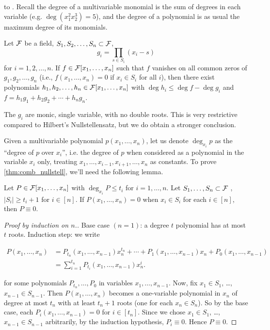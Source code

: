  to .
Recall the degree of a multivariable monomial is the sum of degrees in each variable (e.g. $\deg (x_1^2 x_2^3) = 5$), and the degree of a polynomial is as usual the maximum degree of its monomials.
\begin{theorem} \label{thm:comb_nullstell}
Let $\mathcal{F}$ be a field, $S_1,S_2,\dotsc,S_n\subset \mathcal{F}$, 
\[
g_i = \prod_{s\in S_i}(x_i - s)
\]
for $i=1,2,\dotsc, n$.
If $f\in \mathcal{F}[x_1,\dotsc,x_n]$ such that $f$ vanishes on all common zeros of $g_1,g_2,\dotsc,g_n$ (i.e., $f(x_1,\dotsc,x_n) = 0$ if $x_i\in S_i$ for all $i$), then there exist polynomials $h_1,h_2,\dotsc,h_n\in \mathcal{F}[x_1,\dotsc,x_n]$ with $\deg h_i \leq \deg f - \deg g_i$ and $f = h_1g_1 + h_2g_2 + \dotsm + h_n g_n$.
\end{theorem}
\begin{remark}
The $g_i$ are monic, single variable, with no double roots. This is very restrictive compared to Hilbert's Nullstellensatz, but we do obtain a stronger conclusion.
\end{remark}
Given a multivariable polynomial $p(x_1,\dotsc,x_n)$, let us denote $\deg_{x_i} p$ as the ``degree of $p$ over $x_i$'', i.e. the degree of $p$ when considered as a polynomial in the variable $x_i$ only, treating $x_1,\dotsc,x_{i-1},x_{i+1},\dotsc,x_n$ as constants. To prove \cref{thm:comb_nullstell}, we'll need the following lemma.
\begin{lemma} \label{lem:comb_null_p_vanish}
Let $P\in \mathcal{F}[x_1,\dotsc,x_n]$ with $\deg_{x_i} P \leq t_i$ for $i=1,\dotsc,n$. Let $S_1,\dotsc, S_n \subset \mathcal{F}$ , $|S_i|\geq t_i+1$ for $i\in[n]$. If $P (x_1,\dotsc,x_n) = 0$ when  $x_i\in S_i$ for each $i\in [n]$, then $P \equiv 0$.
\end{lemma}
\begin{proof}[Proof by induction on $n$.]
Base case $(n=1)$: a degree $t$ polynomial has at most $t$ roots.
Induction step: we write
\begin{fullwidth}
\begin{align*}	
P(x_1,\dotsc,x_n) &= P_{t_n}(x_1,\dotsc,x_{n-1}) x_n^{t_n} + \dotsm + P_1 (x_1,\dotsc,x_{n-1}) x_n + P_0 (x_1,\dotsc,x_{n-1}) \\
&= \sum_{i=1}^{t_n} P_{t_i}(x_1,\dotsc,x_{n-1}) x_n^i.
\end{align*}
\end{fullwidth}
for some polynomials $P_{t_n},\dotsc,P_0$ in variables $x_1,\dotsc,x_{n-1}$. 
Now, fix $x_1\in S_1$, \ldots, $x_{n-1} \in S_{n-1}$. Then $P(x_1,\dotsc,x_n)$ becomes a one-variable polynomial in $x_n$ of degree at most $t_n$ with at least $t_n+1$ roots (one for each $x_n \in S_n$). So by the base case, each $P_i(x_1,\dotsc,x_{n-1}) = 0$ for $i\in[t_n]$. Since we chose $x_1\in S_1$, \ldots, $x_{n-1}\in S_{n-1}$ arbitrarily, by the induction hypothesis, $P_i \equiv 0$. Hence $P\equiv 0$.
\end{proof}

